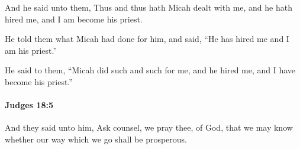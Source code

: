 			\begin{versebox}
					\item[BHS] 
					\item[ASV] And he said unto them, Thus and thus hath Micah dealt with me, and he hath hired me, and I am become his priest.
					\item[NIV] He told them what Micah had done for him, and said, “He has hired me and I am his priest.”
					\item[NRSV] He said to them, “Micah did such and such for me, and he hired me, and I have become his priest.”
			\end{versebox}

		\paragraph{Judges 18:5} %
			\label{JUDGES-18-5}

			And they said unto him, Ask counsel, we pray thee, of God, that we may know whether our way which we go shall be prosperous.

